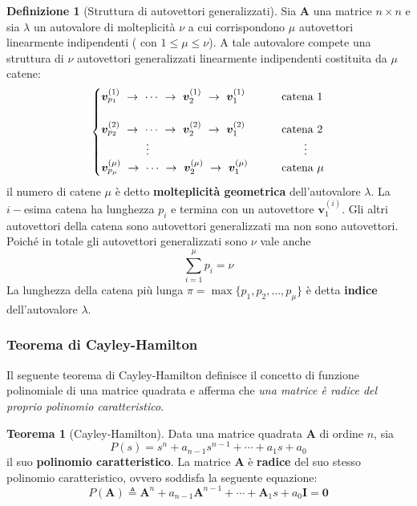 \documentclass[a4paper]{article}
\renewcommand{\vec}{\bm}
\theoremstyle{definition}
\newtheorem{thm}{Teorema}
\newtheorem{defn}{Definizione}[subsection]
\begin{document}
			\begin{defn}[Struttura di autovettori generalizzati]
				Sia $ \vec{A} $ una matrice $ n\times n $ e sia $ \lambda $ un autovalore di molteplicità $ \nu $ a cui corrispondono $ \mu $ autovettori linearmente indipendenti ( con $ 1\leq \mu \leq \nu $).
				A tale autovalore compete una struttura di $ \nu $ autovettori generalizzati linearmente indipendenti costituita da $ \mu $ catene:
				\[
					\begin{cases}
						\vec{v}_{p_1}^{(1)}\ \rightarrow\ \cdots \ \rightarrow\ \vec{v}_{2}^{(1)}\ \rightarrow\ \vec{v}_{1}^{(1)} \qquad & \textup{catena 1} \\ \\
						\vec{v}_{p_2}^{(2)}\ \rightarrow\ \cdots \ \rightarrow\ \vec{v}_{2}^{(2)}\ \rightarrow\ \vec{v}_{1}^{(2)} \qquad & \textup{catena 2} \\
						\qquad\qquad \vdots & \qquad \vdots \\
						\vec{v}_{p_\mu}^{(\mu)}\ \rightarrow\ \cdots \ \rightarrow\ \vec{v}_{2}^{(\mu)}\ \rightarrow\ \vec{v}_{1}^{(\mu)} \qquad & \textup{catena }\mu 
					\end{cases}
				\]
				il numero di catene $ \mu $ è detto \textbf{molteplicità geometrica} dell'autovalore $ \lambda $.
				La $ i-$esima catena ha lunghezza $ p_i $ e termina con un autovettore $ \vec{v}_1^{(i)} $. Gli altri autovettori della catena sono autovettori generalizzati ma non sono autovettori. Poiché in totale gli autovettori generalizzati sono $ \nu $ vale anche 
				\[
					\sum_{i=1}^{\mu} p_i = \nu
				\]
				La lunghezza della catena più lunga $ \pi = \max \{p_1,p_2,\dots,p_{\mu}\} $ è detta \textbf{indice} dell'autovalore $ \lambda $.
 			\end{defn}
 			
 			\subsubsection{Teorema di Cayley-Hamilton}
	 			Il seguente teorema di Cayley-Hamilton definisce il concetto di funzione polinomiale di una matrice quadrata e afferma che \textit{una matrice è radice del proprio polinomio caratteristico}.
	 			
	 			\begin{thm}[Cayley-Hamilton]
					Data una matrice quadrata $ \vec{A} $ di ordine $ n $, sia
					\[
						P(s) = s^n + a_{n-1}s^{n-1} + \cdots + a_1 s + a_0
					\]
					il suo \textbf{polinomio caratteristico}. La matrice $ \vec{A} $ è \textbf{radice} del suo stesso polinomio caratteristico, ovvero soddisfa la seguente equazione:
					\[
						P(\vec{A}) \triangleq \vec{A}^n + a_{n-1} \vec{A}^{n-1} + \cdots + \vec{A}_1 s + a_0\vec{I} = \vec{0}
					\]
	 			\end{thm}
	 			
\end{document}
